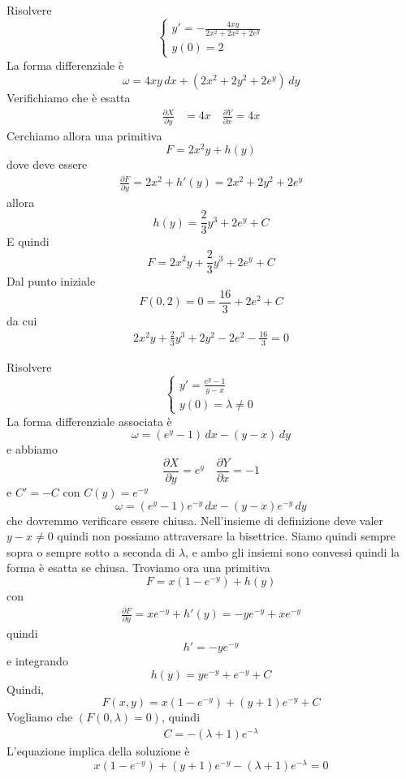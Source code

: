 \documentclass[a4paper]{article}
\begin{document}
\begin{snippetexercise}{}
    Risolvere
    \[
        \begin{cases}
            y' = -\frac{4xy}{2x^2 + 2x^2 + 2e^y} \\
            y(0) = 2
        \end{cases}
    \]
    La forma differenziale è
    \[
        \omega = 4xy\,dx + (2x^2 + 2y^2 + 2e^y)\,dy
    \]
    Verifichiamo che è esatta
    \begin{align*}
        \frac{\partial X}{\partial y} &= 4x \quad
        \frac{\partial Y}{\partial x} = 4x
    \end{align*}
    Cerchiamo allora una primitiva
    \[
        F = 2x^2y + h(y)
    \]
    dove deve essere
    \begin{align*}
        \frac{\partial F}{\partial y} = 2x^2 + h'(y) = 2x^2 + 2y^2 + 2e^y
    \end{align*}
    allora
    \[
        h(y) = \frac{2}{3}y^3 + 2e^y + C
    \]
    E quindi
    \[
        F = 2x^2 y + \frac{2}{3}y^3 + 2e^y + C
    \]
    Dal punto iniziale \[F(0, 2) = 0 = \frac{16}{3} + 2e^2 + C\]
    da cui
    \begin{align*}
        2x^2 y + \frac{2}{3}y^3 + 2y^2 - 2e^2 - \frac{16}{3} = 0
    \end{align*}
\end{snippetexercise}

\begin{snippetexercise}{}
    Risolvere
    \[
        \begin{cases}
            y' = \frac{e^y - 1}{y-x} \\
            y(0) = \lambda \neq 0
        \end{cases}
    \]
    La forma differenziale associata è
    \[
        \omega = (e^y - 1)\,dx - (y-x)\,dy
    \]
    e abbiamo
    \[
        \frac{\partial X}{\partial y} = e^y \quad \frac{\partial Y}{\partial x} = -1
    \]
    e \(C' = -C\) con \(C(y) = e^{-y}\)
    \[
        \omega = (e^y - 1)e^{-y}\,dx
        - (y-x)e^{-y}\,dy
    \]
    che dovremmo verificare essere chiusa.
    Nell'insieme di definizione deve valer \(y-x\neq 0\) quindi non possiamo attraversare la bisettrice.
    Siamo quindi sempre sopra o sempre sotto a seconda di \(\lambda\), e ambo gli insiemi sono convessi
    quindi la forma è esatta se chiusa.
    Troviamo ora una primitiva
    \[
        F = x(1-e^{-y}) + h(y)
    \]
    con
    \begin{align*}
        \frac{\partial F}{\partial y} = xe^{-y} + h'(y) = -ye^{-y} + xe^{-y}
    \end{align*}
    quindi
    \[
        h' = -ye^{-y}
    \]
    e integrando
    \[
        h(y) = ye^{-y} + e^{-y} + C
    \]
    Quindi,
    \[
        F(x,y) = x(1-e^{-y}) + (y+1)e^{-y} + C
    \]
    Vogliamo che \((F(0, \lambda) = 0)\), quindi
    \begin{align*}
        C = - \left(\lambda + 1\right)e^{-\lambda}
    \end{align*}
    L'equazione implica della soluzione è
    \[
        x(1-e^{-y}) + (y+1)e^{-y} - (\lambda + 1) e^{-\lambda} = 0
    \]
\end{snippetexercise}
\end{document}
